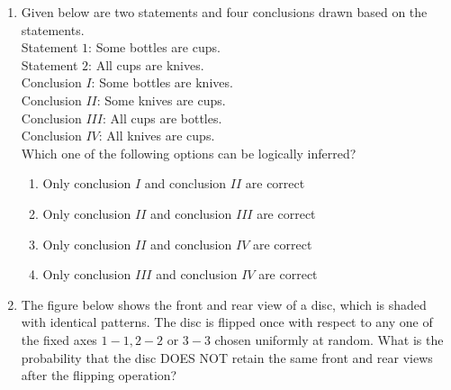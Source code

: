 \documentclass[journal]{IEEEtran}
\begin{document}
\begin{enumerate}
{\begin{multicols}{4}
\end{multicols}
}
\item{
Given below are two statements and four conclusions drawn based on the
statements.\\
Statement $1$: Some bottles are cups.\\
Statement $2$: All cups are knives.\\
Conclusion $I$: Some bottles are knives.\\
Conclusion $II$: Some knives are cups.\\
Conclusion $III$: All cups are bottles.\\
Conclusion $IV$: All knives are cups.\\
Which one of the following options can be logically inferred?
\begin{enumerate}
\item Only conclusion $I$ and conclusion $II$ are correct
\item Only conclusion $II$ and conclusion $III$ are correct
\item Only conclusion $II$ and conclusion $IV$ are correct
\item Only conclusion $III$ and conclusion $IV$ are correct
\end{enumerate}
}
\item{
The figure below shows the front and rear view of a disc, which is shaded with identical patterns. The disc is flipped once with respect to any one of the fixed axes $1-1,2-2$ or $3-3$ chosen uniformly at random.
What is the probability that the disc DOES NOT retain the same front and rear views after the flipping operation?
\begin{figure}[H]
\centering
{}
\end{figure}}
\end{enumerate}
\end{document}
